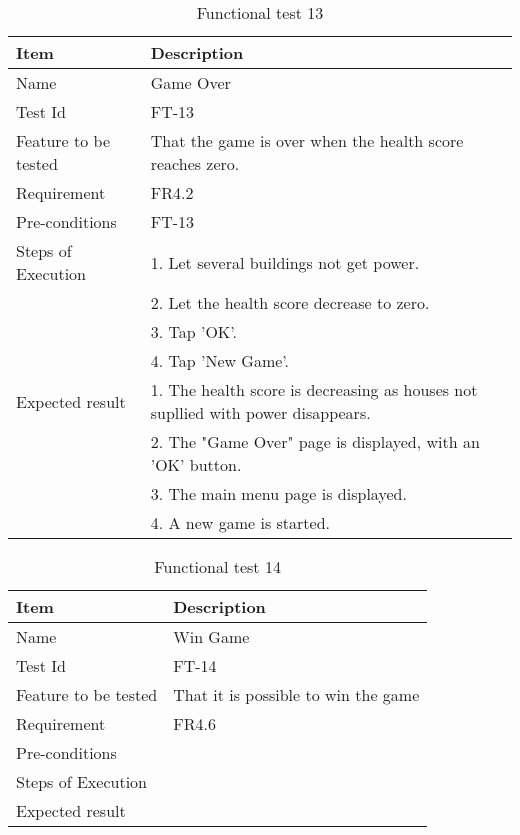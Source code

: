\begin{table}[H]
\centering
	\begin{tabular}{ l | p{8cm} }
		\hline
		{\bf Item} & {\bf Description} \\ \hline
		Name & Game Over \\ 
		Test Id & FT-13 \\ 
		Feature to be tested & That the game is over when the health score reaches zero. \\ 
		Requirement & FR4.2 \\ 
		Pre-conditions & FT-13 \\ 
		Steps of Execution & 1. Let several buildings not get power. \\ 
		& 2. Let the health score decrease to zero. \\
		& 3. Tap 'OK'. \\
		& 4. Tap 'New Game'. \\
		Expected result & 1. The health score is decreasing as houses not supllied with power disappears. \\
		& 2. The "Game Over" page is displayed, with an 'OK' button. \\
		& 3. The main menu page is displayed. \\
		& 4. A new game is started. \\
	\end{tabular}
	\caption{Functional test 13}
\end{table}

\begin{table}[H]
\centering
	\begin{tabular}{ l | p{8cm} }
		\hline
		{\bf Item} & {\bf Description} \\ \hline
		Name & Win Game \\ 
		Test Id & FT-14 \\ 
		Feature to be tested & That it is possible to win the game \\ 
		Requirement & FR4.6 \\ 
		Pre-conditions & \\ 
		Steps of Execution &  \\ 
		Expected result & \\ 
	\end{tabular}
	\caption{Functional test 14}
\end{table}

